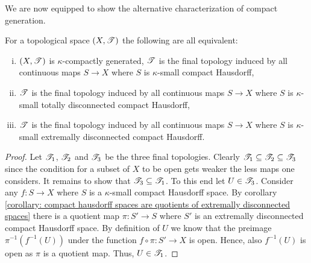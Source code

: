 We are now equipped to show the alternative characterization of compact generation.
\begin{proposition}
	\label{proposition: equivalent characterizations of compact generation}
	
	For a topological space $(X, {\mathscr{T}})$ the following are all equivalent:
	\begin{enumerate}[(i)]
		\item
		$(X, {\mathscr{T}})$ is $\kappa$-compactly generated, \ie ${\mathscr{T}}$ is the final topology induced by all continuous maps $S\to X$ where $S$ is $\kappa$-small compact Hausdorff,
		
		\item
		${\mathscr{T}}$ is the final topology induced by all continuous maps $S\to X$ where $S$ is $\kappa$-small totally disconnected compact Hausdorff,
		
		\item
		${\mathscr{T}}$ is the final topology induced by all continuous maps $S\to X$ where $S$ is $\kappa$-small extremally disconnected compact Hausdorff.
	\end{enumerate}
\end{proposition}

\begin{proof}
	Let ${\mathscr{T}}_1$, ${\mathscr{T}}_2$ and ${\mathscr{T}}_3$ be the three final topologies. Clearly ${\mathscr{T}}_1\subseteq {\mathscr{T}}_2 \subseteq {\mathscr{T}}_3$ since the condition for a subset of $X$ to be open gets weaker the less maps one considers. It remains to show that ${\mathscr{T}}_3 \subseteq {\mathscr{T}}_1$. To this end let $U\in {\mathscr{T}}_3$. Consider any $f\colon S\to X$ where $S$ is a $\kappa$-small compact Hausdorff space. By corollary \ref{corollary: compact hausdorff spaces are quotients of extremally disconnected spaces} there is a quotient map $\pi\colon S'\to S$ where $S'$ is an extremally disconnected compact Hausdorff space. By definition of $U$ we know that the preimage $\pi^{-1}(f^{-1}(U))$ under the function $f\circ\pi\colon S'\to X$ is open. Hence, also $f^{-1}(U)$ is open as $\pi$ is a quotient map. Thus, $U\in {\mathscr{T}}_1$.
\end{proof}


